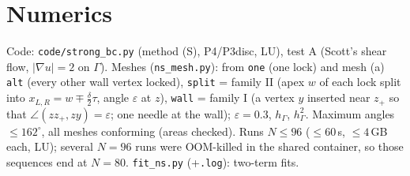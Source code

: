 \documentclass[11pt]{article}
\theoremstyle{remark}
\newcommand{\hG}{h_\Gamma}
\begin{document}
\section{Numerics}
Code: \texttt{code/strong\_bc.py} (method (S), P4/P3disc, LU), test A (Scott's shear flow, $|\nabla u|=2$ on $\Gamma$).
Meshes (\texttt{ns\_mesh.py}): from \texttt{one} (one lock) and mesh (a) \texttt{alt} (every other wall vertex locked),
\texttt{split} = family II (apex $w$ of each lock split into $x_{L,R}=w\mp\frac\delta2\tau$, angle $\varepsilon$ at $z$),
\texttt{wall} = family I (a vertex $y$ inserted near $z_+$ so that $\angle(z z_+,zy)=\varepsilon$; one needle at the wall);
$\varepsilon=0.3$, $\hG$, $\hG^2$. Maximum angles $\le 162^\circ$, all meshes conforming (areas checked).
Runs $N\le96$ (${\le}60$\,s, ${\le}4$\,GB each, LU); several $N=96$ runs were OOM-killed in the shared container, so those sequences end at $N=80$. \texttt{fit\_ns.py} (+\texttt{.log}): two-term fits.


\end{document}
